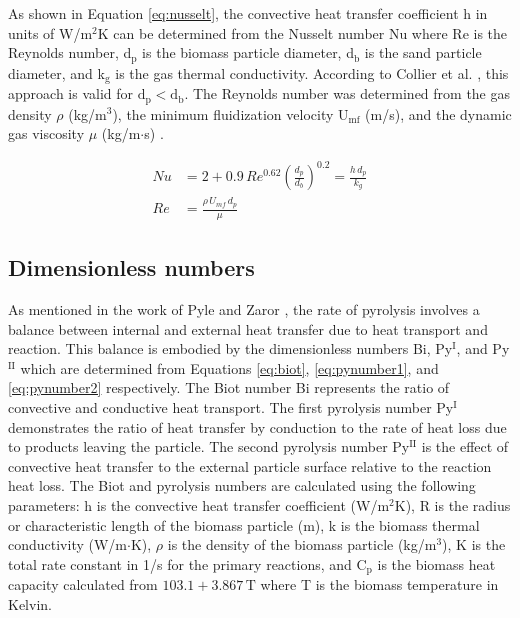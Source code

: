 As shown in Equation \ref{eq:nusselt}, the convective heat transfer coefficient h in units of W/m$^2$K can be determined from the Nusselt number Nu where Re is the Reynolds number, d$_\text{p}$ is the biomass particle diameter, d$_\text{b}$ is the sand particle diameter, and k$_\text{g}$ is the gas thermal conductivity. According to Collier et al. \cite{Collier-2004}, this approach is valid for $\text{d}_\text{p} < \text{d}_\text{b}$. The Reynolds number was determined from the gas density $\rho$ (kg/m$^3$), the minimum fluidization velocity U$_\text{mf}$ (m/s), and the dynamic gas viscosity $\mu$ (kg/m$\cdot$s) \cite{Papadikis-2010}.

\begin{align}
    Nu &= 2 + 0.9\, Re^{0.62} \left(\frac{d_p}{d_b}\right)^{0.2} = \frac{h\, d_p}{k_g} \label{eq:nusselt} \\
    Re &= \frac{\rho\, U_{mf}\, d_p}{\mu}
\end{align}


\subsection{Dimensionless numbers}

As mentioned in the work of Pyle and Zaror \cite{Pyle-1984}, the rate of pyrolysis involves a balance between internal and external heat transfer due to heat transport and reaction. This balance is embodied by the dimensionless numbers Bi, Py$^\text{I}$, and Py$^\text{II}$ which are determined from Equations \ref{eq:biot}, \ref{eq:pynumber1}, and \ref{eq:pynumber2} respectively. The Biot number Bi represents the ratio of convective and conductive heat transport. The first pyrolysis number Py$^\text{I}$ demonstrates the ratio of heat transfer by conduction to the rate of heat loss due to products leaving the particle. The second pyrolysis number Py$^\text{II}$ is the effect of convective heat transfer to the external particle surface relative to the reaction heat loss. The Biot and pyrolysis numbers are calculated using the following parameters: h is the convective heat transfer coefficient (W/m$^2$K), R is the radius or characteristic length of the biomass particle (m), k is the biomass thermal conductivity (W/m$\cdot$K), $\rho$ is the density of the biomass particle (kg/m$^3$), K is the total rate constant in 1/s for the primary reactions, and C$_\text{p}$ is the biomass heat capacity calculated from $103.1 + 3.867\,\text{T}$ where T is the biomass temperature in Kelvin.

